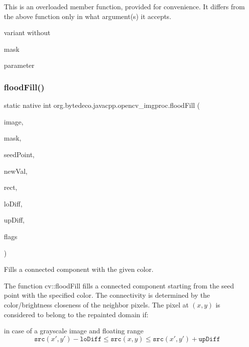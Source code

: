 This is an overloaded member function, provided for convenience. It differs from the above function only in what argument(s) it accepts. 

variant without
\begin{DoxyCode}
mask 
\end{DoxyCode}
 parameter \mbox{\label{group__imgproc__misc_gae1a712c481241605487f34e3b969f49c}} 
\subsubsection{\texorpdfstring{flood\+Fill()}{floodFill()}\hspace{0.1cm}{\footnotesize\ttfamily [2/2]}}
{\footnotesize\ttfamily static native int org.\+bytedeco.\+javacpp.\+opencv\+\_\+imgproc.\+flood\+Fill (\begin{DoxyParamCaption}\item[{@By\+Val Mat}]{image,  }\item[{@By\+Val Mat}]{mask,  }\item[{@By\+Val Point}]{seed\+Point,  }\item[{@By\+Val Scalar}]{new\+Val,  }\item[{Rect}]{rect,  }\item[{@By\+Val(null\+Value=\char`\"{}cv\+::\+Scalar()\char`\"{}) Scalar}]{lo\+Diff,  }\item[{@By\+Val(null\+Value=\char`\"{}cv\+::\+Scalar()\char`\"{}) Scalar}]{up\+Diff,  }\item[{int}]{flags }\end{DoxyParamCaption})\hspace{0.3cm}{\ttfamily [static]}}



Fills a connected component with the given color. 

The function cv\+::flood\+Fill fills a connected component starting from the seed point with the specified color. The connectivity is determined by the color/brightness closeness of the neighbor pixels. The pixel at $(x,y)$ is considered to belong to the repainted domain if\+: 


\begin{DoxyItemize}
\item in case of a grayscale image and floating range \[\texttt{src} (x',y')- \texttt{loDiff} \leq \texttt{src} (x,y) \leq \texttt{src} (x',y')+ \texttt{upDiff}\] 
\end{DoxyItemize}



